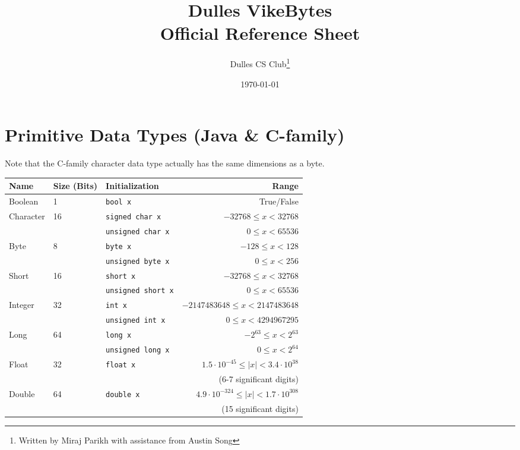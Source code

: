 \documentclass{article}
\title{Dulles VikeBytes\\Official Reference Sheet}
\date{\today}
\author{Dulles CS Club\thanks{Written by Miraj Parikh with assistance from Austin Song}}
\begin{document}

{\let\newpage\relax\maketitle} %

\renewcommand{\arraystretch}{1.25} %
\section{Primitive Data Types (Java \& C-family)}
Note that the C-family character data type actually has the same dimensions as a byte.
\begin{center}\begin{tabular}{lllr}\toprule
  Name      &Size (Bits) &Initialization              &Range \\\midrule
  Boolean   &1           &\lstinline|bool x|          &True/False \\\midrule
  Character &16          &\lstinline|signed char x|   &\(-32768 \leq x < 32768\) \\ 
            &            &\lstinline|unsigned char x| &\(0 \leq x < 65536\) \\
  Byte      &8           &\lstinline|byte x|          &\(-128 \leq x < 128\) \\
            &            &\lstinline|unsigned byte x| &\(0 \leq x < 256\) \\
  Short     &16          &\lstinline|short x|         &\(-32768 \leq x < 32768\) \\
            &            &\lstinline|unsigned short x|&\(0 \leq x < 65536\) \\
  Integer   &32          &\lstinline|int x|           &\(-2147483648 \leq x < 2147483648\) \\
            &            &\lstinline|unsigned int x|  &\(0 \leq x < 4294967295\) \\
  Long      &64          &\lstinline|long x|          &\(-2^{63} \leq x < 2^{63}\) \\
            &            &\lstinline|unsigned long x| &\(0 \leq x < 2^{64}\) \\\midrule
  Float     &32          &\lstinline|float x|         &\(1.5\cdot10^{-45} \leq |x| < 3.4\cdot10^{38}\) \\
            &            &                            &(6-7 significant digits) \\
  Double    &64          &\lstinline|double x|        &\(4.9\cdot10^{-324} \leq |x| < 1.7\cdot10^{308}\) \\
            &            &                            &(15 significant digits) \\
\bottomrule\end{tabular}\end{center}
\end{document}
